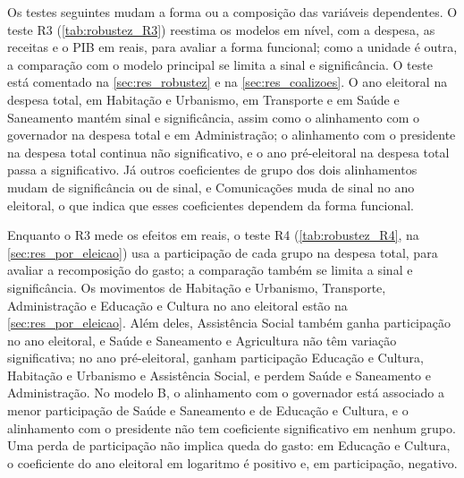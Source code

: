 Os testes seguintes mudam a forma ou a composição das variáveis dependentes. O teste R3 (\autoref{tab:robustez_R3}) reestima os modelos em nível, com a despesa, as receitas e o PIB em reais, para avaliar a forma funcional; como a unidade é outra, a comparação com o modelo principal se limita a sinal e significância. O teste está comentado na \autoref{sec:res_robustez} e na \autoref{sec:res_coalizoes}. O ano eleitoral na despesa total, em Habitação e Urbanismo, em Transporte e em Saúde e Saneamento mantém sinal e significância, assim como o alinhamento com o governador na despesa total e em Administração; o alinhamento com o presidente na despesa total continua não significativo, e o ano pré-eleitoral na despesa total passa a significativo. Já outros coeficientes de grupo dos dois alinhamentos mudam de significância ou de sinal, e Comunicações muda de sinal no ano eleitoral, o que indica que esses coeficientes dependem da forma funcional.

Enquanto o R3 mede os efeitos em reais, o teste R4 (\autoref{tab:robustez_R4}, na \autoref{sec:res_por_eleicao}) usa a participação de cada grupo na despesa total, para avaliar a recomposição do gasto; a comparação também se limita a sinal e significância. Os movimentos de Habitação e Urbanismo, Transporte, Administração e Educação e Cultura no ano eleitoral estão na \autoref{sec:res_por_eleicao}. Além deles, Assistência Social também ganha participação no ano eleitoral, e Saúde e Saneamento e Agricultura não têm variação significativa; no ano pré-eleitoral, ganham participação Educação e Cultura, Habitação e Urbanismo e Assistência Social, e perdem Saúde e Saneamento e Administração. No modelo B, o alinhamento com o governador está associado a menor participação de Saúde e Saneamento e de Educação e Cultura, e o alinhamento com o presidente não tem coeficiente significativo em nenhum grupo. Uma perda de participação não implica queda do gasto: em Educação e Cultura, o coeficiente do ano eleitoral em logaritmo é positivo e, em participação, negativo.


